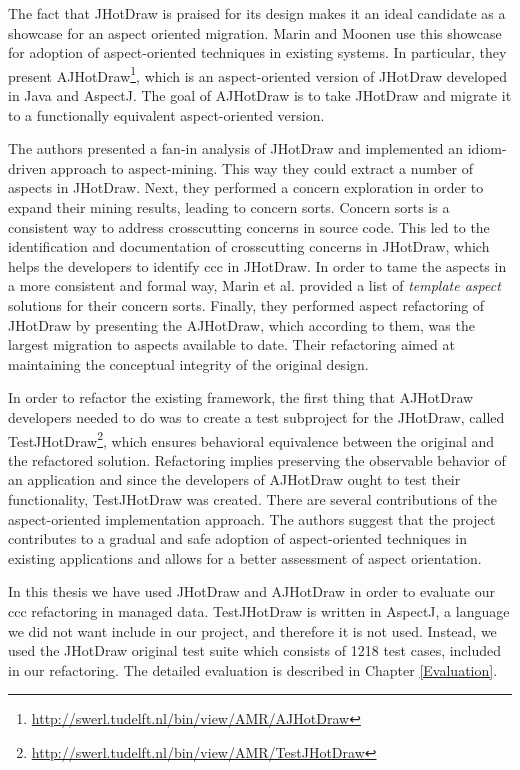 The fact that JHotDraw is praised for its design makes it an ideal candidate as a showcase for an aspect oriented migration. 
Marin and Moonen \cite{marinajhotdraw} use this showcase for adoption of aspect-oriented techniques in existing systems. 
In particular, they present AJHotDraw\footnote{\url{http://swerl.tudelft.nl/bin/view/AMR/AJHotDraw}}, which is an aspect-oriented version of JHotDraw developed in Java and AspectJ. 
The goal of AJHotDraw is to take JHotDraw and migrate it to a functionally equivalent aspect-oriented version. 

The authors presented a fan-in analysis of JHotDraw \cite{marin2004identifying} and implemented an idiom-driven approach to aspect-mining. 
This way they could extract a number of aspects in JHotDraw. 
Next, they performed a concern exploration in order to expand their mining results, leading to concern sorts.
Concern sorts is a consistent way to address crosscutting concerns in source code.
This led to the identification and documentation of crosscutting concerns in JHotDraw, which helps the developers to identify \ac{ccc} in JHotDraw.
In order to tame the aspects in a more consistent and formal way, Marin et al. provided a list of \textit{template aspect} solutions for their concern sorts.
Finally, they performed aspect refactoring of JHotDraw by presenting the AJHotDraw, which according to them, was the largest migration to aspects available to date.
Their refactoring aimed at maintaining the conceptual integrity of the original design.

In order to refactor the existing framework, the first thing that AJHotDraw developers needed to do was to create a test subproject for the JHotDraw, called TestJHotDraw\footnote{\url{http://swerl.tudelft.nl/bin/view/AMR/TestJHotDraw}}, which ensures behavioral equivalence between the original and the refactored solution. 
Refactoring implies preserving the observable behavior of an application\cite{fowler2009refactoring} and since the developers of AJHotDraw ought to test their functionality, TestJHotDraw was created. 
There are several contributions of the aspect-oriented implementation approach\cite{marinajhotdraw}. 
The authors suggest that the project contributes to a gradual and safe adoption of aspect-oriented techniques in existing applications and allows for a better assessment of aspect orientation.

In this thesis we have used JHotDraw and AJHotDraw in order to evaluate our \ac{ccc} refactoring in managed data.
TestJHotDraw is written in AspectJ, a language we did not want include in our project, and therefore it is not used.
Instead, we used the JHotDraw original test suite which consists of 1218 test cases, included in our refactoring.
The detailed evaluation is described in Chapter \ref{Evaluation}.

